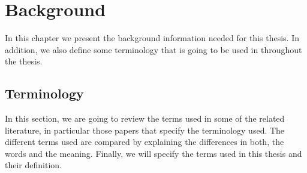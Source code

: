 \chapter{Background}\label{ch:Background}
In this chapter we present the background information needed for this thesis. In addition, we also define some terminology that is going to be used in throughout the thesis.

\section{Terminology}
In this section, we are going to review the terms used in some of the related literature, in particular those papers that specify the terminology used. The different terms used are compared by explaining the differences in both, the words and the meaning. Finally, we will specify the terms used in this thesis and their definition.

